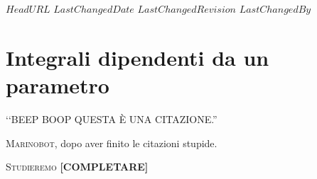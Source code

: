 \svnidlong
{$HeadURL$}
{$LastChangedDate$}
{$LastChangedRevision$}
{$LastChangedBy$}

\chapter{Integrali dipendenti da un parametro}

\begin{introduction}
	‘‘BEEP BOOP QUESTA È UNA CITAZIONE.''
	\begin{flushright}
		\textsc{Marinobot,} dopo aver finito le citazioni stupide.
	\end{flushright}
\end{introduction}
\lettrine[findent=1pt, nindent=0pt]{S}{tudieremo} \textbf{[COMPLETARE]}
